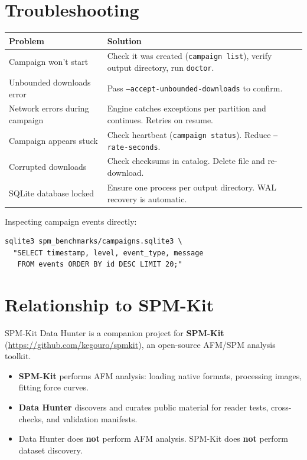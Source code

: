 \documentclass[11pt,a4paper]{article}
\begin{document}
\section{Troubleshooting}

\begin{center}
\begin{tabularx}{\linewidth}{>{\RaggedRight}p{5cm}>{\RaggedRight}X}
\toprule
\textbf{Problem} & \textbf{Solution} \\
\midrule
Campaign won't start & Check it was created (\texttt{campaign list}), verify output directory, run \texttt{doctor}. \\[4pt]
Unbounded downloads error & Pass \texttt{--accept-unbounded-downloads} to confirm. \\[4pt]
Network errors during campaign & Engine catches exceptions per partition and continues. Retries on resume. \\[4pt]
Campaign appears stuck & Check heartbeat (\texttt{campaign status}). Reduce \texttt{--rate-seconds}. \\[4pt]
Corrupted downloads & Check checksums in catalog. Delete file and re-download. \\[4pt]
SQLite database locked & Ensure one process per output directory. WAL recovery is automatic. \\
\bottomrule
\end{tabularx}
\end{center}

Inspecting campaign events directly:

\begin{lstlisting}
sqlite3 spm_benchmarks/campaigns.sqlite3 \
  "SELECT timestamp, level, event_type, message
   FROM events ORDER BY id DESC LIMIT 20;"
\end{lstlisting}

\section{Relationship to SPM-Kit}

SPM-Kit Data Hunter is a companion project for \textbf{SPM-Kit} (\url{https://github.com/kegouro/spmkit}), an open-source AFM/SPM analysis toolkit.

\begin{itemize}[nosep]
  \item \textbf{SPM-Kit} performs AFM analysis: loading native formats, processing images, fitting force curves.
  \item \textbf{Data Hunter} discovers and curates public material for reader tests, cross-checks, and validation manifests.
  \item Data Hunter does \textbf{not} perform AFM analysis. SPM-Kit does \textbf{not} perform dataset discovery.
\end{itemize}
\end{document}
